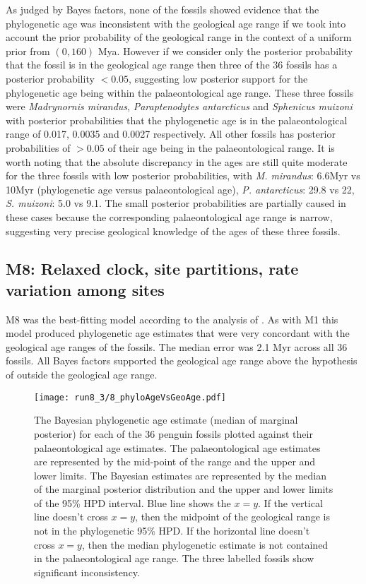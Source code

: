 \documentclass[11pt]{article}
\newcommand{\Mstrict}{{M1}}
\newcommand{\Mrelaxed}{{M8}}
\begin{document}
As judged by Bayes factors, none of the fossils showed evidence that the phylogenetic age was inconsistent with the geological age range if we took into account the prior probability of the geological range in the context of a uniform prior from $(0,160)$ Mya. However if we consider only the posterior probability that the fossil is in the geological age range then three of the 36 fossils has a posterior probability $< 0.05$, suggesting low posterior support for the phylogenetic age being within the palaeontological age range. These three fossils were {\em Madrynornis mirandus}, {\em Paraptenodytes antarcticus} and {\em Sphenicus muizoni} with posterior probabilities that the phylogenetic age is in the palaeontological range of 0.017, 0.0035 and 0.0027 respectively. All other fossils has posterior probabilities of $> 0.05$ of their age being in the palaeontological range. It is worth noting that the absolute discrepancy in the ages are still quite moderate for the three fossils with low posterior probabilities, with {\em M. mirandus}: 6.6Myr vs 10Myr (phylogenetic age versus palaeontological age), {\em P. antarcticus}: 29.8 vs 22, {\em S. muizoni}: 5.0 vs 9.1. The small posterior probabilities are partially caused in these cases because the corresponding palaeontological age range is narrow, suggesting very precise geological knowledge of the ages of these three fossils.

\subsection*{\Mrelaxed{}: Relaxed clock, site partitions, rate variation among sites}

\Mrelaxed{} was the best-fitting model according to the analysis of \textcite{gavryushkina2015bayesian}. As with \Mstrict{} this model produced phylogenetic age estimates that were very concordant with the geological age ranges of the fossils. The median error was 2.1 Myr across all 36 fossils. All Bayes factors supported the geological age range above the hypothesis of outside the geological age range.

\begin{figure}
\texttt{[image: run8\_3/8\_phyloAgeVsGeoAge.pdf]}
\caption{\label{fig:phyloAgeVsGeoAge}
The Bayesian phylogenetic age estimate (median of marginal posterior) for each of the 36 penguin fossils plotted against their palaeontological age estimates. The palaeontological age estimates are represented by the mid-point of the range and the upper and lower limits. The Bayesian estimates are represented by the median of the marginal posterior distribution and the upper and lower limits of the 95\% HPD interval. Blue line shows the $x=y$. If the vertical line doesn't cross $x=y$, then the midpoint of the geological range is not in the phylogenetic 95\% HPD. If the horizontal line doesn't cross $x=y$, then the median phylogenetic estimate is not contained in the palaeontological age range. The three labelled fossils show significant inconsistency.}
\end{figure}
\end{document}
